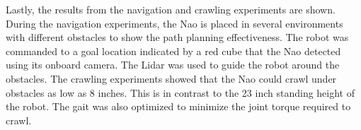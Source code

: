 {Lastly, the results from the navigation and crawling experiments are shown.
During the navigation experiments, the Nao is placed in several environments
with different obstacles to show the path planning effectiveness. The robot
was commanded to a goal location indicated by a red cube that the Nao
detected using its onboard camera. The Lidar was used to guide the robot around
the obstacles.
The crawling experiments showed that the Nao could crawl under obstacles as low
as 8 inches. This is in contrast to the 23 inch standing height of the robot.
The gait was also optimized to minimize the joint torque required to crawl.

\clearpage}
{\endmsabstract}
